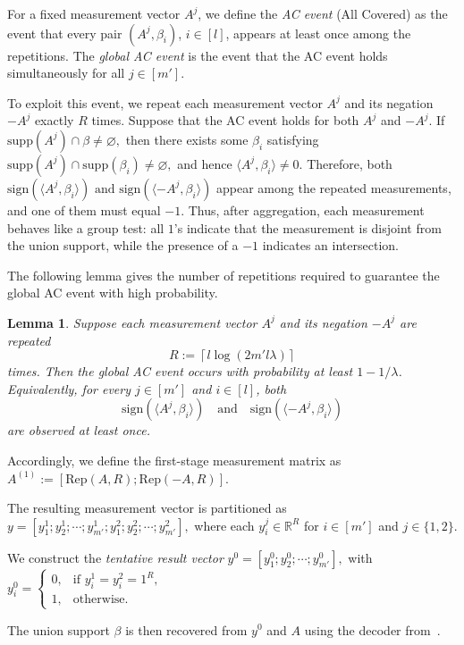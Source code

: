 \documentclass[10pt,a4paper]{amsart}
\newtheorem{lemma}{Lemma}[section]
\newcommand{\supp}{\mathrm{supp}}
\newcommand{\sign}{\mathrm{sign}}
\begin{document}
For a fixed measurement vector $A^j$, we define the \emph{AC event} (All Covered) as the event that every pair $(A^j,\beta_i)$, $i\in[l]$, appears at least once among the repetitions. The \emph{global AC event} is the event that the AC event holds simultaneously for all $j\in[m']$.

To exploit this event, we repeat each measurement vector $A^j$ and its negation $-A^j$ exactly $R$ times. Suppose that the AC event holds for both $A^j$ and $-A^j$. If
\(
\supp(A^j)\cap\beta\neq\varnothing,
\)
then there exists some $\beta_i$ satisfying
\(
\supp(A^j)\cap\supp(\beta_i)\neq\varnothing,
\)
and hence $\langle A^j,\beta_i\rangle\neq0$. Therefore, both
\(
\sign(\langle A^j,\beta_i\rangle) \text{ and }
\sign(\langle -A^j,\beta_i\rangle)
\)
appear among the repeated measurements, and one of them must equal $-1$. Thus, after aggregation, each measurement behaves like a group test: all $1$'s indicate that the measurement is disjoint from the union support, while the presence of a $-1$ indicates an intersection.

The following lemma gives the number of repetitions required to guarantee the global AC event with high probability.

\begin{lemma}\label{lem:rep1}
Suppose each measurement vector $A^j$ and its negation $-A^j$ are repeated
\[
R:=\left\lceil l\log(2m'l\lambda)\right\rceil
\]
times. Then the global AC event occurs with probability at least $1-1/\lambda$. Equivalently, for every $j\in[m']$ and $i\in[l]$, both
\[
\sign(\langle A^j,\beta_i\rangle)
\quad\text{and}\quad
\sign(\langle -A^j,\beta_i\rangle)
\]
are observed at least once.
\end{lemma}

Accordingly, we define the first-stage measurement matrix as
\(
A^{(1)}:=[\mathrm{Rep}(A,R);\mathrm{Rep}(-A,R)].
\)

The resulting measurement vector is partitioned as
\(
y=[y_1^1;y_2^1;\cdots;y_{m'}^1;
   y_1^2;y_2^2;\cdots;y_{m'}^2],
\)
where each $y_i^j\in\mathbb{R}^R$ for $i\in[m']$ and $j\in\{1,2\}$. 

We construct the \emph{tentative result vector}
\(
y^0=[y_1^0;y_2^0;\cdots;y_{m'}^0],
\)
with
\(
y_i^0=
\begin{cases}
0,&\text{if }y_i^1=y_i^2=1^R,\\
1,&\text{otherwise.}
\end{cases}
\)

The union support $\beta$ is then recovered from $y^0$ and $A$ using the decoder from~\cite{li2025support}.
\end{document}
